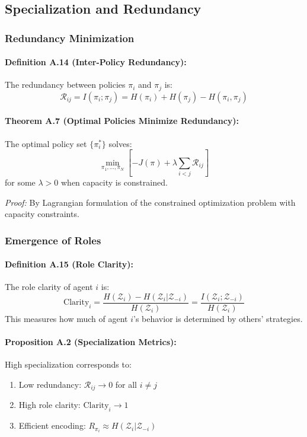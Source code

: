 \documentclass[10pt, letterpaper]{article}
\begin{document}
\subsection{Specialization and Redundancy}

\subsubsection{Redundancy Minimization}

\paragraph{Definition A.14 (Inter-Policy Redundancy):} The redundancy between policies $\pi_i$ and $\pi_j$ is:
\[\mathcal{R}_{ij} = I(\pi_i; \pi_j) = H(\pi_i) + H(\pi_j) - H(\pi_i, \pi_j)\]

\paragraph{Theorem A.7 (Optimal Policies Minimize Redundancy):} The optimal policy set $\{\pi^*_i\}$ solves:
\[\min_{\pi_1,...,\pi_N} \left[ -J(\pi) + \lambda \sum_{i<j} \mathcal{R}_{ij} \right]\]
for some $\lambda > 0$ when capacity is constrained.

\emph{Proof:} By Lagrangian formulation of the constrained optimization problem with capacity constraints.

\subsubsection{Emergence of Roles}

\paragraph{Definition A.15 (Role Clarity):} The role clarity of agent $i$ is:
\[\text{Clarity}_i = \frac{H(\mathcal{Z}_i) - H(\mathcal{Z}_i | \mathcal{Z}_{-i})}{H(\mathcal{Z}_i)} = \frac{I(\mathcal{Z}_i; \mathcal{Z}_{-i})}{H(\mathcal{Z}_i)}\]
This measures how much of agent $i$'s behavior is determined by others' strategies.

\paragraph{Proposition A.2 (Specialization Metrics):} High specialization corresponds to:
\begin{enumerate}
    \item Low redundancy: $\mathcal{R}_{ij} \to 0$ for all $i \neq j$
    \item High role clarity: $\text{Clarity}_i \to 1$
    \item Efficient encoding: $R_{\pi_i} \approx H(\mathcal{Z}_i | \mathcal{Z}_{-i})$
\end{enumerate}
\end{document}
